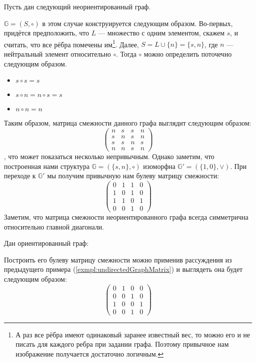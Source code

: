 \begin{example}\label{exmpl:undirectedGraphMatrix}
  Пусть дан следующий неориентированный граф.
  \begin{center}
    
  \end{center}

$\mathbb{G} = (S,\circ)$ в этом случае конструируется следующим образом. Во-первых, придётся предположить, что $L$ --- множество с одним элементом, скажем $s$, и считать, что все рёбра помечены им\footnote{А раз все рёбра имеют одинаковый заранее известный вес, то можно его и не писать для каждого ребра при задании графа. Поэтому привычное нам изображение получается достаточно логичным.}. Далее, $S = L \cup{\{n\}} = \{s,n\}$, где $n$ --- нейтральный элемент относительно $\circ$. Тогда $\circ$ можно определить поточечно следующим образом.
\begin{itemize}
  \item $s \circ s = s$
  \item $s \circ n = n \circ s = s$
  \item $n \circ n = n$
\end{itemize}

Таким образом, матрица смежности данного графа выглядит следующим образом:
$$
\begin{pmatrix}
  n & s & s & n \\
  s & n & s & n \\
  s & s & n & s \\
  n & n & s & n
\end{pmatrix}
$$
, что может показаться несколько непривычным. Однако заметим, что построенная нами структура $\mathbb{G} = (\{s,n\}, \circ)$ изоморфна $\mathbb{G}' = (\{1,0\}, \vee)$. При переходе к $\mathbb{G}'$ мы получим привычную нам булеву матрицу смежности:
  $$
  \begin{pmatrix}
    0 & 1 & 1 & 0 \\
    1 & 0 & 1 & 0 \\
    1 & 1 & 0 & 1 \\
    0 & 0 & 1 & 0
  \end{pmatrix}
  $$
  Заметим, что матрица смежности неориентированного графа всегда симметрична относительно главной диагонали.
\end{example}

\begin{example}\label{example:diGraph}
  Дан ориентированный граф:
  \begin{center}
  
  \end{center}

  Построить его булеву матрицу смежности можно применив рассуждения из предыдущего примера (\ref{exmpl:undirectedGraphMatrix}) и выглядеть она будет следующим образом:
  $$
  \begin{pmatrix}
    0 & 1 & 0 & 0 \\
    0 & 0 & 1 & 0 \\
    1 & 0 & 0 & 1 \\
    0 & 0 & 1 & 0
  \end{pmatrix}
  $$
\end{example}

